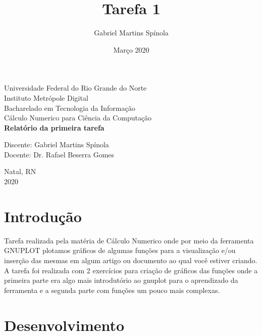\documentclass{article}
\title{Tarefa 1}
\author{Gabriel Martins Spínola}
\date{Março 2020}
\begin{document}
\begin{titlepage} %
\begin{center} %
{\large Universidade Federal do Rio Grande do Norte}\\[0.2cm] %
{\large Instituto Metrópole Digital}\\[0.2cm] %
{\large Bacharelado em Tecnologia da Informação}\\[0.2cm]
{\large Cálculo Numerico para Ciência da Computação}\\[5.0cm]
{\bf \huge Relatório da primeira tarefa}\\[5.0cm] %
\end{center} %
{\large Discente: Gabriel Martins Spínola}\\[0.7cm] %
{\large Docente: Dr. Rafael Beserra Gomes}\\[3.2cm]
\begin{center}
{\large Natal, RN}\\[0.2cm]
{\large 2020}
\end{center}
\end{titlepage} %


\section*{Introdução}
\hspace{1cm}Tarefa realizada pela matéria de Cálculo Numerico onde por meio da ferramenta GNUPLOT plotamos gráficos de algumas funções para a visualização e/ou inserção das mesmas em algum artigo ou documento ao qual você estiver criando. A tarefa foi realizada com 2 exercícios para criação de gráficos das funções onde a primeira parte era algo mais introdutório ao gnuplot para o aprendizado da ferramenta e a segunda parte com funções um pouco mais complexas.

\section*{Desenvolvimento}
\end{document}
